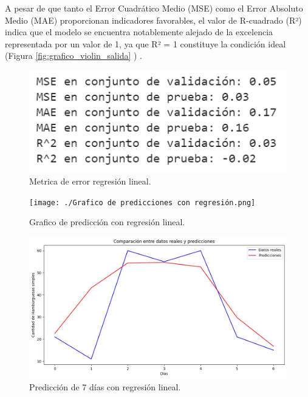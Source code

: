   A pesar de que tanto el Error Cuadrático Medio (MSE) como el Error Absoluto Medio (MAE) proporcionan indicadores favorables, el valor de R-cuadrado (R²) indica que el modelo se encuentra notablemente alejado de la excelencia representada por un valor de 1, ya que R² = 1 constituye la condición ideal (Figura \ref{fig:grafico_violin_salida} ) .

  \begin{figure}[H]
    \begin{center}
      \includegraphics[scale=0.70]{./metricas de error REGRESION LINEAL.png}
      \caption{Metrica de error regresión lineal.}
      \label{fig:metricas_regresion}
    \end{center}
  \end{figure}

  \begin{figure}[H]
    \begin{center}
      \texttt{[image: ./Grafico de predicciones con regresión.png]}
      \caption{Grafico de predicción con regresión lineal.}
      \label{fig:prediccion_regresion}
    \end{center}
  \end{figure}

  \begin{figure}[H]
    \begin{center}
      \includegraphics[scale=0.50]{./modeloLineal7Dias.jpg}
      \caption{Predicción de 7 días con regresión lineal.}
      \label{fig:grafico_lstm}
    \end{center}
  \end{figure}


